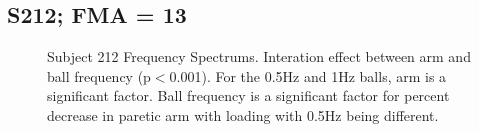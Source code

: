 \documentclass{article}
\begin{document}
\clearpage
\subsection{S212; FMA = 13}

\begin{figure}[!ht]
     \centering
     \hfill
     \hfill
	\caption{Subject 212 Frequency Spectrums. Interation effect between arm and ball frequency (p$<$0.001). For the 0.5Hz and 1Hz balls, arm is a significant factor. Ball frequency is a significant factor for percent decrease in paretic arm with loading  with 0.5Hz being different.}
\end{figure}
\end{document}
